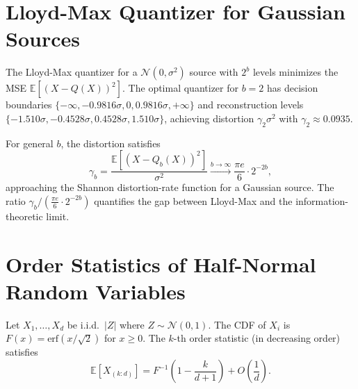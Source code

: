 \documentclass[10pt,twocolumn]{article}
\theoremstyle{definition}
\newcommand{\E}{\mathbb{E}}
\newcommand{\calN}{\mathcal{N}}
\begin{document}
\clearpage
\appendix

\section{Lloyd-Max Quantizer for Gaussian Sources}
\label{app:lloyd_max}

The Lloyd-Max quantizer for a $\calN(0, \sigma^2)$ source with $2^b$ levels
minimizes the MSE $\E[(X - Q(X))^2]$.  The optimal quantizer for $b = 2$ has
decision boundaries $\{-\infty, -0.9816\sigma, 0, 0.9816\sigma, +\infty\}$
and reconstruction levels $\{-1.510\sigma, -0.4528\sigma, 0.4528\sigma,
1.510\sigma\}$, achieving distortion $\gamma_2 \sigma^2$ with
$\gamma_2 \approx 0.0935$.

For general $b$, the distortion satisfies
\begin{equation}
  \gamma_b = \frac{\E[(X - Q_b(X))^2]}{\sigma^2}
    \xrightarrow{b \to \infty} \frac{\pi e}{6} \cdot 2^{-2b},
\end{equation}
approaching the Shannon distortion-rate function for a Gaussian source.  The
ratio $\gamma_b / (\frac{\pi e}{6} \cdot 2^{-2b})$ quantifies the gap between
Lloyd-Max and the information-theoretic limit.

\begin{table}[h]
  \centering
  \caption{Lloyd-Max distortion factors for Gaussian $\calN(0,1)$.}
  \label{tab:lloyd_max}
  \small
\end{table}

\section{Order Statistics of Half-Normal Random Variables}
\label{app:order_stats}

Let $X_1, \ldots, X_d$ be i.i.d.\ $|Z|$ where $Z \sim \calN(0, 1)$.  The CDF
of $X_i$ is $F(x) = \text{erf}(x/\sqrt{2})$ for $x \geq 0$.  The $k$-th order
statistic (in decreasing order) satisfies
\begin{equation}
  \E[X_{(k:d)}] = F^{-1}\!\left(1 - \frac{k}{d+1}\right)
    + O\!\left(\frac{1}{d}\right).
\end{equation}
\end{document}

